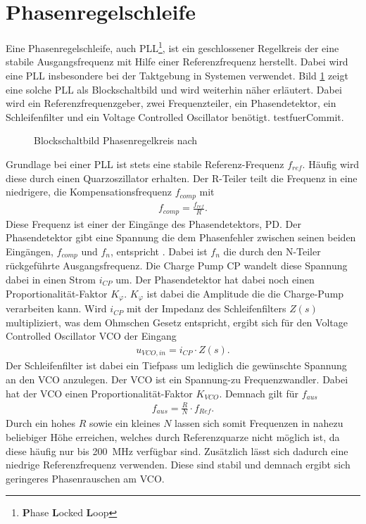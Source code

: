 \section{Phasenregelschleife}
Eine Phasenregelschleife, auch PLL\footnote{ \textbf{P}hase \textbf{L}ocked \textbf{L}oop}, ist ein geschlossener Regelkreis der eine stabile Ausgangsfrequenz mit Hilfe einer Referenzfrequenz herstellt. Dabei wird eine PLL insbesondere bei der Taktgebung in Systemen verwendet. Bild \ref{fig:PLL_Blockerino} zeigt eine solche PLL als Blockschaltbild und wird weiterhin näher erläutert. Dabei wird ein Referenzfrequenzgeber, zwei Frequenzteiler, ein Phasendetektor, ein Schleifenfilter und ein Voltage Controlled Oscillator benötigt. testfuerCommit.
\begin{figure}[tbp]
  \centering
  
  \caption{Blockschaltbild Phasenregelkreis nach \cite{PLL_Perf}}
  \label{fig:PLL_Blockerino}
\end{figure}
Grundlage bei einer PLL ist stets eine stabile Referenz-Frequenz $f_{ref}$. Häufig wird diese durch einen Quarzoszillator erhalten. Der R-Teiler teilt die Frequenz in eine niedrigere, die Kompensationsfrequenz $f_{comp}$ mit 
\begin{align}
f_{comp} = \frac{f_{ref}}{R}.
\end{align} 
Diese Frequenz ist einer der Eingänge des Phasendetektors, PD. Der Phasendetektor gibt eine Spannung die dem Phasenfehler zwischen seinen beiden Eingängen, $f_{comp}$ und $f_{n}$, entspricht .  Dabei ist $f_{n}$ die durch den N-Teiler rückgeführte Ausgangsfrequenz. Die Charge Pump CP wandelt diese Spannung dabei in einen Strom $i_{CP}$ um. Der Phasendetektor hat dabei noch einen Proportionalität-Faktor $K_{\varphi}$. $K_{\varphi}$ ist dabei die Amplitude die die Charge-Pump verarbeiten kann. Wird $i_{CP}$ mit der Impedanz des Schleifenfilters $Z(s)$ multipliziert, was dem Ohmschen Gesetz entspricht, ergibt sich für den Voltage Controlled Oscillator VCO der Eingang 
\begin{align}
u_{VCO,in} = i_{CP}\cdot Z(s).
\end{align} 
Der Schleifenfilter ist dabei ein Tiefpass um lediglich die gewünschte Spannung an den VCO anzulegen. Der VCO ist ein Spannung-zu Frequenzwandler. Dabei hat der VCO einen Proportionalität-Faktor $K_{VCO}$. Demnach gilt für $f_{aus}$
\begin{align}
f_{aus} = \frac{R}{N} \cdot f_{Ref}.
\end{align} 
Durch ein hohes $R$ sowie ein kleines $N$ lassen sich somit Frequenzen in nahezu beliebiger Höhe erreichen, welches durch Referenzquarze nicht möglich ist, da diese häufig nur bis \SI{200}{\mega\hertz} verfügbar sind. Zusätzlich lässt sich dadurch eine niedrige Referenzfrequenz verwenden. Diese sind stabil und demnach ergibt sich geringeres Phasenrauschen am VCO.\\
